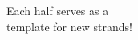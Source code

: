 \documentclass[preview]{standalone}
\begin{document}
Each half serves as a \\ template for new strands!
\end{document}
